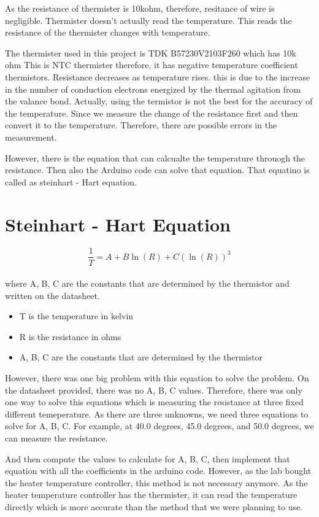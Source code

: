 \documentclass{article}
\begin{document}
As the resistance of thermister is 10kohm, therefore, resitance of 
wire is negligible.
Thermister doesn't actually read the temperature. 
This reads the resistance of the thermister changes with temperature.

The thermister used in this project is TDK B57230V2103F260 which has 10k ohm
This is NTC thermister therefore, it has negative temperature coefficient thermistors.
Resistance decreases as temperature rises. 
this is due to the increase in the number of conduction electrons energized by the thermal
agitation from the valance bond. 
Actually, using the termistor is not the best for the accuracy of the temperature.
Since we measure the change of the resistance first and then convert it to the temperature.
Therefore, there are possible errors in the measurement.

However, there is the equation that can calcualte the temperature throuogh the resistance.
Then also the Arduino code can solve that equation. 
That equatino is called as steinhart - Hart equation.

\section{Steinhart - Hart Equation}

\LARGE
\begin{equation}
    \frac{1}{T} = A + B\ln(R) + C(\ln(R))^3
\end{equation}
\\
\normalsize
where A, B, C are the constants that are determined by the thermistor and written on the datasheet.
\begin{itemize}
    \item T is the temperature in kelvin
    \item R is the resistance in ohms
    \item A, B, C are the constants that are determined by the thermistor
\end{itemize}

However, there was one big problem with this equation to solve the problem.
On the datasheet provided, there was no A, B, C values.
Therefore, there was only one way to solve this equations which is measuring the resistance at 
three fixed different temeperature. 
As there are three unknowns, we need three equations to solve for A, B, C.
For example, at 40.0 degrees, 45.0 degrees, and 50.0 degrees, we can measure the resistance.

And then compute the values to calculate for A, B, C, then
implement that equation with all the coefficients in the arduino code. 
However, as the lab bought the heater temperature controller, this method is not necessary anymore.
As the heater temperature controller has the thermister, it can read the temperature directly which is 
more accurate than the method that we were planning to use. 
\end{document}
